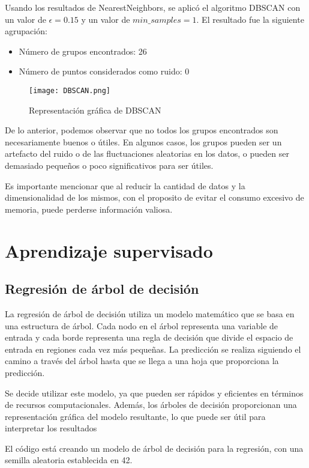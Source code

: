 \documentclass{article}
\begin{document}
Usando los resultados de NearestNeighbors, se aplicó el algoritmo DBSCAN con un valor de $\epsilon = 0.15$ y un valor de $min\_samples = 1$. El resultado fue la siguiente agrupación:

\begin{itemize}
\item Número de grupos encontrados: 26
\item Número de puntos considerados como ruido: 0
\end{itemize}

\begin{figure}[h]
\centering
\texttt{[image: DBSCAN.png]}
\caption{Representación gráfica de DBSCAN}
\label{fig:reachability_plot}
\end{figure}

De lo anterior, podemos observar que no todos los grupos encontrados son necesariamente buenos o útiles. En algunos casos, los grupos pueden ser un artefacto del ruido o de las fluctuaciones aleatorias en los datos, o pueden ser demasiado pequeños o poco significativos para ser útiles. 

Es importante mencionar que al reducir la cantidad de datos y la dimensionalidad de los mismos, con el proposito de evitar el consumo excesivo de memoria, puede perderse información valiosa.

\section{Aprendizaje supervisado}
\subsection{Regresión de árbol de decisión}
La regresión de árbol de decisión utiliza un modelo matemático que se basa en una estructura de árbol. Cada nodo en el árbol representa una variable de entrada y cada borde representa una regla de decisión que divide el espacio de entrada en regiones cada vez más pequeñas. La predicción se realiza siguiendo el camino a través del árbol hasta que se llega a una hoja que proporciona la predicción.

Se decide utilizar este modelo, ya que pueden ser rápidos y eficientes en términos de recursos computacionales. Además, los árboles de decisión proporcionan una representación gráfica del modelo resultante, lo que puede ser útil para interpretar los resultados

 El código está creando un modelo de árbol de decisión para la regresión, con una semilla aleatoria establecida en 42.
\end{document}
